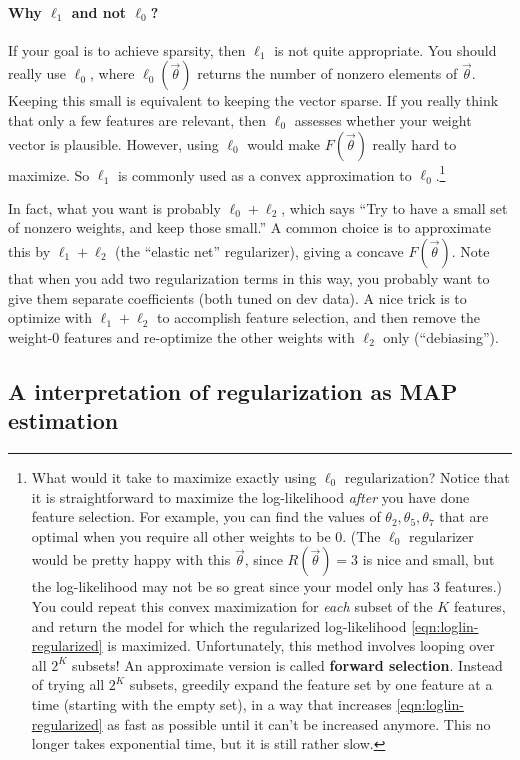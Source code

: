 \documentclass[11pt]{article}
\newcommand{\vtheta}{\vec{\theta}}
\begin{document}
\paragraph{Why $\ell_1$ and not $\ell_0$?}  If your goal is to achieve sparsity, then $\ell_1$ is not quite appropriate.  You should really use $\ell_0$, where $\ell_0(\vtheta)$ returns the number of nonzero elements of $\vtheta$.  Keeping this small is equivalent to keeping the vector sparse.  If you really think that only a few features are relevant, then $\ell_0$ assesses whether your weight vector is plausible.  However, using $\ell_0$ would make $F(\vtheta)$ really hard to maximize.  So $\ell_1$ is commonly used as a convex approximation to $\ell_0$.\footnote{What would it take to maximize exactly using $\ell_0$ regularization?  Notice that it is straightforward to maximize the log-likelihood {\em after} you have done feature selection.  For example, you can find the values of $\theta_2, \theta_5, \theta_7$ that are optimal when you require all other weights to be 0.  (The $\ell_0$ regularizer would be pretty happy with this $\vtheta$, since $R(\vtheta)=3$ is nice and small, but the log-likelihood may not be so great since your model only has 3 features.)  You could repeat this convex maximization for {\em each} subset of the $K$ features, and return the model for which the regularized log-likelihood \eqref{eqn:loglin-regularized} is maximized.  Unfortunately, this method involves looping over all $2^K$ subsets!
  An approximate version is called {\bf forward selection}.  Instead of trying all $2^K$ subsets, greedily expand the feature set by one feature at a time
  (starting with the empty set), in a way that increases \eqref{eqn:loglin-regularized} as fast as possible until it can't be increased anymore.  This no longer takes exponential time, but it is still rather slow.}

In fact, what you want is probably $\ell_0 + \ell_2$, which says ``Try to have a small set of nonzero weights, and keep those small.''  A common choice is to approximate this by $\ell_1+\ell_2$ (the ``elastic net'' regularizer), giving a concave $F(\vtheta)$.  Note that when you add two regularization terms in this way, you probably want to give them separate coefficients (both tuned on dev data).  A nice trick is to optimize with $\ell_1+\ell_2$ to accomplish feature selection, and then remove the weight-0 features and re-optimize the other weights with $\ell_2$ only (``debiasing'').


\subsection{A interpretation of regularization as MAP estimation}
\end{document}
